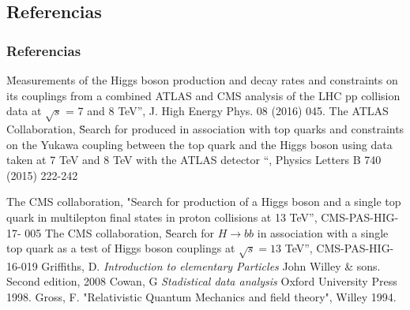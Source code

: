 \documentclass[11pt]{beamer}
\begin{document}
\begin{thebibliography}{99}
\begin{frame}
\section{Referencias}
\frametitle{Referencias}


	\"Measurements of the Higgs boson production and decay rates and constraints on
	its couplings from a combined ATLAS and CMS analysis of the LHC pp collision
	data at $\sqrt{s}$ = 7 and 8 TeV”, J. High Energy Phys. 08 (2016) 045.
	The ATLAS Collaboration, \"Search for produced in association with top quarks
	and constraints on the Yukawa coupling between the top quark and the Higgs
	boson using data taken at 7 TeV and 8 TeV with the ATLAS detector “, Physics
	Letters B 740 (2015) 222-242
\end{frame}

\begin{frame}
	The CMS collaboration, "Search for production of a Higgs boson and a single top
quark in multilepton final states in proton collisions at 13 TeV”, CMS-PAS-HIG-17-
005
		The CMS collaboration, \"Search for $H \rightarrow bb$ in association with a single top quark
	as a test of Higgs boson couplings at $\sqrt{s}= 13$ TeV”, CMS-PAS-HIG-16-019
	Griffiths, D.  {\em Introduction to elementary Particles} John Willey \& sons. 
	Second edition, 2008
	 Cowan, G {\em Stadistical data analysis} Oxford University Press 1998.
	 Gross, F. "Relativistic Quantum Mechanics and field theory", Willey 1994. 
\end{frame}
\end{thebibliography}
\end{document}

